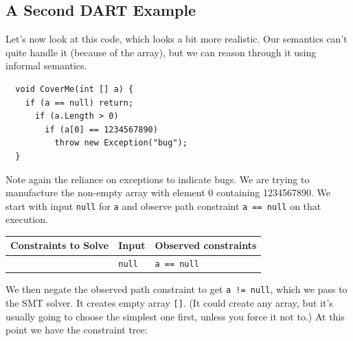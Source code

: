 \documentclass[11pt]{article}
\begin{document}
\subsection*{A Second DART Example}
Let's now look at this code, which looks a bit more realistic. Our semantics can't quite handle it (because of the array), but we can reason through it using informal semantics.
\begin{lstlisting}
  void CoverMe(int [] a) {
    if (a == null) return;
      if (a.Length > 0)
        if (a[0] == 1234567890)
          throw new Exception("bug");
  }
\end{lstlisting}
Note again the reliance on exceptions to indicate bugs. We are trying to manufacture the non-empty
array with element 0 containing 1234567890. We start with input \texttt{null} for \texttt{a} and observe
path constraint \texttt{a == null} on that execution.

\begin{center}
\begin{tabular}{l|l|l}
  Constraints to Solve & Input & Observed constraints\\ \hline
   & \texttt{null} & \texttt{a == null}
\end{tabular}
\end{center}

We then negate the observed path constraint to get \texttt{a != null}, which we pass to the SMT solver. It creates
empty array \texttt{[]}. (It could create any array, but it's usually going to choose the simplest one first, unless you
force it not to.) At this point we have the constraint tree:
\end{document}
